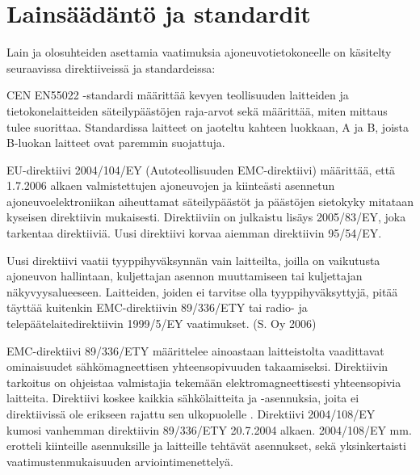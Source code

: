 
\newpage

\chapter{Lainsäädäntö ja standardit}

Lain ja olosuhteiden asettamia vaatimuksia ajoneuvotietokoneelle on käsitelty seuraavissa direktiiveissä ja standardeissa:

CEN EN55022 -standardi määrittää kevyen teollisuuden laitteiden ja tietokonelaitteiden säteilypäästöjen raja-arvot sekä määrittää, miten mittaus tulee suorittaa. Standardissa laitteet on jaoteltu kahteen luokkaan, A ja B, joista B-luokan laitteet ovat paremmin suojattuja.\cite{EN55022}

EU-direktiivi 2004/104/EY (Autoteollisuuden EMC-direktiivi) määrittää, että
1.7.2006 alkaen valmistettujen ajoneuvojen ja kiinteästi asennetun
ajoneuvoelektroniikan aiheuttamat säteilypäästöt ja päästöjen sietokyky
mitataan kyseisen direktiivin mukaisesti. Direktiiviin on julkaistu
lisäys 2005/83/EY, joka tarkentaa direktiiviä. Uusi direktiivi korvaa
aiemman direktiivin 95/54/EY.

Uusi direktiivi vaatii tyyppihyväksynnän vain laitteilta, joilla on
vaikutusta ajoneuvon hallintaan, kuljettajan asennon muuttamiseen tai
kuljettajan näkyvyysalueeseen. Laitteiden, joiden ei tarvitse olla
tyyppihyväksyttyjä, pitää täyttää kuitenkin EMC-direktiivin 89/336/ETY
tai radio- ja telepäätelaitedirektiivin 1999/5/EY vaatimukset. (S. Oy
2006) \cite{1999/5/EY} \cite{89/336/ETY}

EMC-direktiivi 89/336/ETY määrittelee ainoastaan laitteistolta
vaadittavat ominaisuudet sähkömagneettisen yhteensopivuuden
takaamiseksi. Direktiivin tarkoitus on ohjeistaa valmistajia tekemään
elektromagneettisesti yhteensopivia laitteita. Direktiivi koskee kaikkia
sähkölaitteita ja -asennuksia, joita ei direktiivissä ole erikseen
rajattu sen ulkopuolelle \cite{89/336/ETY}. Direktiivi 2004/108/EY
kumosi vanhemman direktiivin 89/336/ETY 20.7.2004 alkaen. 2004/108/EY
mm. erotteli kiinteille asennuksille ja laitteille tehtävät asennukset,
sekä yksinkertaisti vaatimustenmukaisuuden arviointimenettelyä.
\cite{2004/108/EY}

